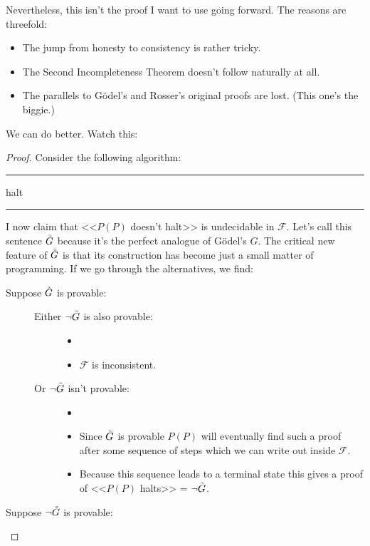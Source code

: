 \documentclass{article}
\theoremstyle{customstyle}
\newcommand{\F}{\ensuremath{\mathcal{F}}}
\newcommand{\iGoedel}{\ensuremath{\accentset{\scalebox{0.35}{$\infty$}}{G}}}
\newenvironment{algo}{\begin{samepage}\medskip\hrule\begin{algorithmic}}{\end{algorithmic}\hrule\medskip\end{samepage}}
\begin{document}
Nevertheless, this isn't the proof I want to use going forward. The reasons are threefold:
\begin{itemize}[topsep=0.5em, label=$\bullet$]
\item The jump from honesty to consistency is rather tricky.
\item The Second Incompleteness Theorem doesn't follow naturally at all.
\item The parallels to Gödel's and Rosser's original proofs are lost. (This one's the biggie.)
\end{itemize}
We can do better. Watch this:
\begin{proof}
Consider the following algorithm:
\begin{algo}
      \State halt
    \EndIf
  \EndFor
\EndFunction
\end{algo}
I now claim that <<$P(P)$ doesn't halt>> is undecidable in $\F$. Let's call this sentence $\iGoedel$ because it's the perfect analogue of Gödel's $G$. The critical new feature of $\iGoedel$ is that its construction has become just a small matter of programming. If we go through the alternatives, we find:
\begin{description}
\item[Suppose $\iGoedel$ is provable:]
\begin{description}
\item[]
\item[Either $\neg \iGoedel$ is also provable:]
\begin{itemize}
\item[]
\item $\F$ is inconsistent. \lightning
\end{itemize}
\item[Or $\neg \iGoedel$ isn't provable:]
\begin{itemize}
\item[]
\item Since $\iGoedel$ is provable $P(P)$ will eventually find such a proof after some sequence of steps which we can write out inside $\F$.
\item Because this sequence leads to a terminal state this gives a proof of <<$P(P)$ halts>> = $\neg \iGoedel$. \lightning
\end{itemize}
\end{description}
\item[Suppose $\neg \iGoedel$ is provable:]
\begin{description}

\end{description}
\end{description}
\end{proof}
\end{document}
